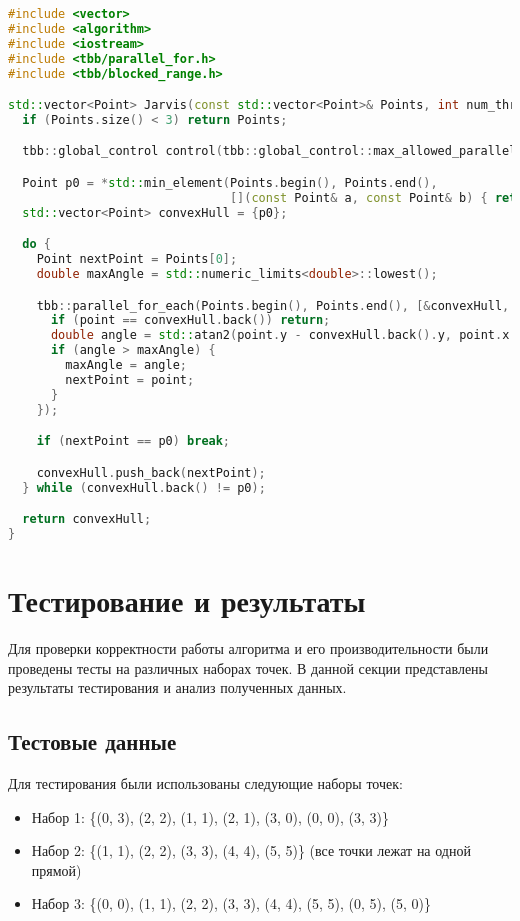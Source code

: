 \documentclass[]{article}
\theoremstyle{remark}
\theoremstyle{definition}
\begin{document}
\begin{lstlisting}[language=C++]
#include <vector>
#include <algorithm>
#include <iostream>
#include <tbb/parallel_for.h>
#include <tbb/blocked_range.h>

std::vector<Point> Jarvis(const std::vector<Point>& Points, int num_threads) {
  if (Points.size() < 3) return Points;

  tbb::global_control control(tbb::global_control::max_allowed_parallelism, num_threads);

  Point p0 = *std::min_element(Points.begin(), Points.end(),
                               [](const Point& a, const Point& b) { return a.x < b.x || (a.x == b.x && a.y < b.y); });
  std::vector<Point> convexHull = {p0};

  do {
    Point nextPoint = Points[0];
    double maxAngle = std::numeric_limits<double>::lowest();

    tbb::parallel_for_each(Points.begin(), Points.end(), [&convexHull, &nextPoint, &maxAngle](const Point& point) {
      if (point == convexHull.back()) return;
      double angle = std::atan2(point.y - convexHull.back().y, point.x - convexHull.back().x);
      if (angle > maxAngle) {
        maxAngle = angle;
        nextPoint = point;
      }
    });

    if (nextPoint == p0) break;

    convexHull.push_back(nextPoint);
  } while (convexHull.back() != p0);

  return convexHull;
}
\end{lstlisting}

\newpage

\section{Тестирование и результаты}

\par Для проверки корректности работы алгоритма и его производительности были проведены тесты на различных наборах точек. В данной секции представлены результаты тестирования и анализ полученных данных.

\subsection{Тестовые данные}

\par Для тестирования были использованы следующие наборы точек:
\begin{itemize}
    \item Набор 1: \{(0, 3), (2, 2), (1, 1), (2, 1), (3, 0), (0, 0), (3, 3)\}
    \item Набор 2: \{(1, 1), (2, 2), (3, 3), (4, 4), (5, 5)\} (все точки лежат на одной прямой)
    \item Набор 3: \{(0, 0), (1, 1), (2, 2), (3, 3), (4, 4), (5, 5), (0, 5), (5, 0)\}
\end{itemize}
\end{document}

